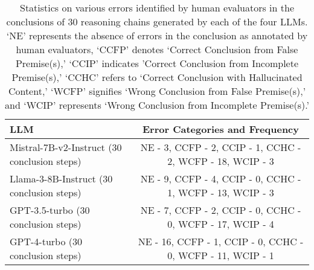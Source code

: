 \begin{table*}[!htbp]
\small
\centering
\begin{tabular}{lc}
\toprule
LLM   & Error Categories and Frequency\\ 
\midrule
Mistral-7B-v2-Instruct (30 conclusion steps)   & NE - 3, CCFP - 2, CCIP - 1, CCHC - 2, WCFP - 18, WCIP - 3\\  

Llama-3-8B-Instruct (30 conclusion steps)   & NE - 9, CCFP - 4, CCIP - 0, CCHC - 1, WCFP - 13, WCIP - 3\\

GPT-3.5-turbo (30 conclusion steps)   & 	NE - 7, CCFP - 2, CCIP - 0, CCHC - 0, WCFP - 17, WCIP - 4\\

GPT-4-turbo (30 conclusion steps)    & NE - 16, CCFP - 1, CCIP - 0, CCHC - 0, WCFP - 11, WCIP - 1
\\ 
\bottomrule
\end{tabular}
\caption{Statistics on various errors identified by human evaluators in the conclusions of 30 reasoning chains generated by each of the four LLMs. `NE' represents the absence of errors in the conclusion as annotated by human evaluators, `CCFP' denotes `Correct Conclusion from False Premise(s),' `CCIP' indicates 'Correct Conclusion from Incomplete Premise(s),' `CCHC' refers to `Correct Conclusion with Hallucinated Content,' `WCFP' signifies `Wrong Conclusion from False Premise(s),' and `WCIP' represents `Wrong Conclusion from Incomplete Premise(s).'}
\label{table:manual-evaluation-conclusion}
\end{table*}